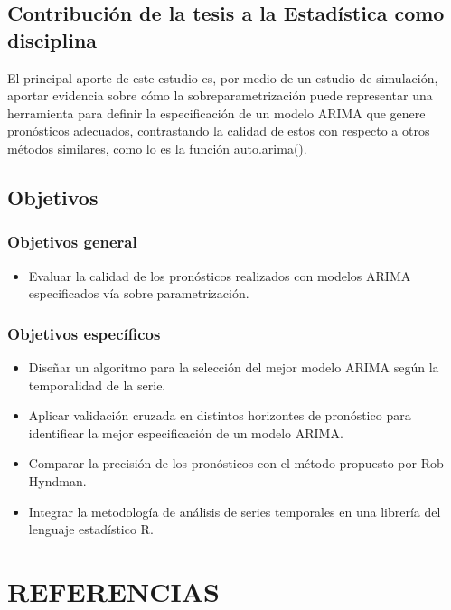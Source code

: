 \documentclass[]{article}
\providecommand{\tightlist}{%
  \setlength{\itemsep}{0pt}\setlength{\parskip}{0pt}}
\begin{document}
\subsection{Contribución de la tesis a la Estadística como disciplina}

El principal aporte de este estudio es, por medio de un estudio de
simulación, aportar evidencia sobre cómo la sobreparametrización puede
representar una herramienta para definir la especificación de un modelo
ARIMA que genere pronósticos adecuados, contrastando la calidad de estos
con respecto a otros métodos similares, como lo es la función
auto.arima().

\subsection{Objetivos}

\subsubsection{Objetivos general}

\begin{itemize}
\tightlist
\item
  Evaluar la calidad de los pronósticos realizados con modelos ARIMA
  especificados vía sobre parametrización.
\end{itemize}

\subsubsection{Objetivos específicos}

\begin{itemize}
\tightlist
\item
  Diseñar un algoritmo para la selección del mejor modelo ARIMA según la
  temporalidad de la serie.
\item
  Aplicar validación cruzada en distintos horizontes de pronóstico para
  identificar la mejor especificación de un modelo ARIMA.
\item
  Comparar la precisión de los pronósticos con el método propuesto por
  Rob Hyndman.
\item
  Integrar la metodología de análisis de series temporales en una
  librería del lenguaje estadístico R.
\end{itemize}

\section{REFERENCIAS}
\end{document}

